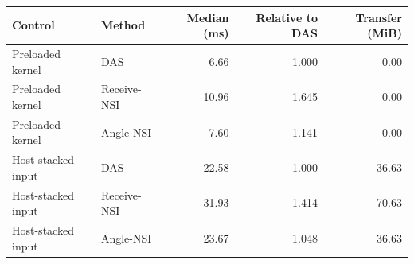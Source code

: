 \begin{tabular}{@{}llrrr@{}}
\toprule
Control & Method & Median (ms) & Relative to DAS & Transfer (MiB) \\
\midrule
Preloaded kernel & DAS & 6.66 & 1.000 & 0.00 \\
Preloaded kernel & Receive-NSI & 10.96 & 1.645 & 0.00 \\
Preloaded kernel & Angle-NSI & 7.60 & 1.141 & 0.00 \\
Host-stacked input & DAS & 22.58 & 1.000 & 36.63 \\
Host-stacked input & Receive-NSI & 31.93 & 1.414 & 70.63 \\
Host-stacked input & Angle-NSI & 23.67 & 1.048 & 36.63 \\
\bottomrule
\end{tabular}
